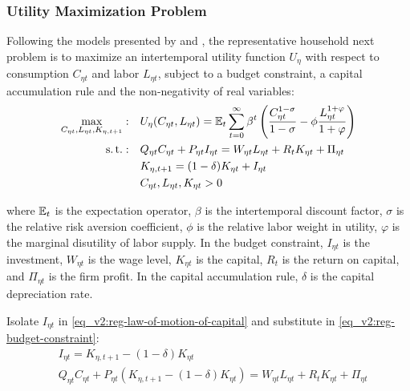 \documentclass[../thesis.tex]{subfiles}
\begin{document}
\subsubsection*{Utility Maximization Problem}

	Following the models presented by \textcite{costa_junior_understanding_2016} and \textcite{solis-garcia_ucb_2022}, the representative household next problem is to maximize an intertemporal utility function $U_{\eta}$ with respect to consumption $C_{\eta t}$ and labor $L_{\eta t}$, subject to a budget constraint, a capital accumulation rule and the non-negativity of real variables:
	\begin{align}
		\max_{C_{\eta t}, L_{\eta t}, K_{\eta,t+1}}: &\quad U_{\eta}(C_{\eta t},L_{\eta t}) = {\mathbb{E}_{t}} \sum_{t=0}^{\infty} \beta^t \left(\frac{C_{\eta t}^{1-\sigma}}{1-\sigma} - \phi \frac{L_{\eta t}^{1+\varphi}}{1+\varphi} \right) \label{eq_v2:reg-utility-function} 
		\\
		\operatorname{s.t.}: &\quad Q_{\eta t} C_{\eta t} + P_{\eta t} I_{\eta t} = W_{\eta t} L_{\eta t} + R_{t} K_{\eta t} + \Pi_{\eta t} \label{eq_v2:reg-budget-constraint} \\
		&\quad K_{\eta,t+1} = (1 - \delta) K_{\eta t} + I_{\eta t} \label{eq_v2:reg-law-of-motion-of-capital} \\
		&\quad C_{\eta t}, L_{\eta t}, K_{\eta t} > 0 \nonumber
	\end{align}

	where ${\mathbb{E}_{t}}$ is the expectation operator, $\beta$ is the intertemporal discount factor, $\sigma$ is the relative risk aversion coefficient, $\phi$ is the relative labor weight in utility, $\varphi$ is the marginal disutility of labor supply. In the budget constraint,
	$I_{\eta t}$ is the investment,
	$W_{\eta t}$ is the wage level,
	$K_{\eta t}$ is the capital, $R_{t}$ is the return on capital,
	and $\Pi_{\eta t}$ is the firm profit. In the capital accumulation rule, $\delta$ is the capital depreciation rate.

	Isolate $I_{\eta t}$ in \ref{eq_v2:reg-law-of-motion-of-capital} and substitute in \ref{eq_v2:reg-budget-constraint}:
	\begin{align}
		& I_{\eta t} = K_{\eta,t+1} - (1 - \delta) K_{\eta t} \label{eq_v2:reg-law-of-motion-of-capital-2} \\
		& Q_{\eta t} C_{\eta t} + P_{\eta t} (K_{\eta,t+1} - (1 - \delta) K_{\eta t}) = W_{\eta t} L_{\eta t} + R_{t} K_{\eta t} + \Pi_{\eta t} \label{eq_v2:reg-budget-constraint-2}
	\end{align}
\end{document}
